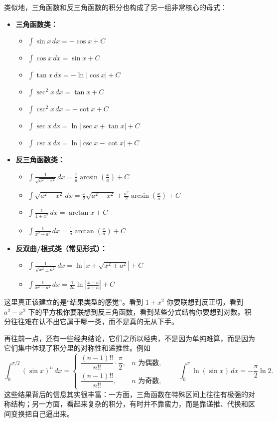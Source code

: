 \documentclass[UTF8]{ctexbook}
\begin{document}
类似地，三角函数和反三角函数的积分也构成了另一组非常核心的母式：
\begin{itemize}
  \item \textbf{三角函数类：}
  \begin{itemize}
    \item $\int \sin x\,dx=-\cos x+C$
    \item $\int \cos x\,dx=\sin x+C$
    \item $\int \tan x\,dx=-\ln|\cos x|+C$
    \item $\int \sec^2 x\,dx=\tan x+C$
    \item $\int \csc^2 x\,dx=-\cot x+C$
    \item $\int \sec x\,dx=\ln|\sec x+\tan x|+C$
    \item $\int \csc x\,dx=\ln|\csc x-\cot x|+C$
  \end{itemize}

  \item \textbf{反三角函数类：}
  \begin{itemize}
    \item $\int \frac{1}{\sqrt{a^2-x^2}}\,dx=\frac{1}{a}\arcsin\!\left(\frac{x}{a}\right)+C$
    \item $\int \sqrt{a^2-x^2}\,dx=\frac{x}{2}\sqrt{a^2-x^2}+\frac{a^2}{2}\arcsin\!\left(\frac{x}{a}\right)+C$
    \item $\int \frac{1}{1+x^2}\,dx=\arctan x+C$
    \item $\int \frac{1}{x^2+a^2}\,dx=\frac{1}{a}\arctan\!\left(\frac{x}{a}\right)+C$
  \end{itemize}

  \item \textbf{反双曲/根式类（常见形式）：}
  \begin{itemize}
    \item $\int \frac{1}{\sqrt{x^2\pm a^2}}\,dx=\ln\left|x+\sqrt{x^2\pm a^2}\right|+C$
    \item $\int \frac{1}{x^2-a^2}\,dx=\frac{1}{2a}\ln\left|\frac{x-a}{x+a}\right|+C$
  \end{itemize}
\end{itemize}
这里真正该建立的是“结果类型的感觉”。看到 $1+x^2$ 你要联想到反正切，看到 $a^2-x^2$ 下的平方根你要联想到反三角函数，看到某些分式结构你要想到对数。积分往往难在认不出它属于哪一类，而不是真的无从下手。

再往前一点，还有一些经典结论，它们之所以经典，不是因为单纯难算，而是因为它们集中体现了积分里的对称性和递推性。例如
\[
\int_0^{\pi/2}(\sin x)^n\,dx=
\begin{cases}
\dfrac{(n-1)!!}{n!!}\cdot \dfrac{\pi}{2}, & n\text{ 为偶数},\\[4pt]
\dfrac{(n-1)!!}{n!!}, & n\text{ 为奇数},
\end{cases}
\qquad
\int_0^\pi \ln(\sin x)\,dx=-\frac{\pi}{2}\ln 2.
\]
这些结果背后的信息其实很丰富：一方面，三角函数在特殊区间上往往有极强的对称结构；另一方面，看起来复杂的积分，有时并不靠蛮力，而是靠递推、代换和区间变换把自己逼出来。
\end{document}
